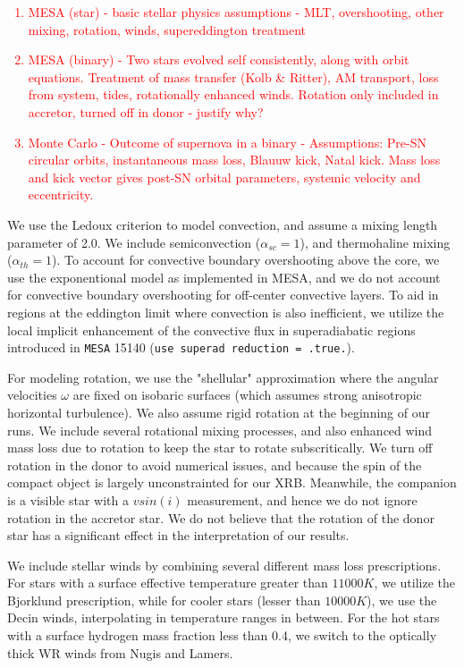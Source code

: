 \documentclass[linenumbers,trackchanges,twocolumn]{aastex701}
\newcommand{\red}{\textcolor{red}}
\begin{document}
\red{
\begin{enumerate}
    \item MESA (star) - basic stellar physics assumptions - MLT, overshooting, other mixing, rotation, winds, supereddington treatment
    \item MESA (binary) - Two stars evolved self consistently, along with orbit equations. Treatment of mass transfer (Kolb \& Ritter), AM transport, loss from system, tides, rotationally enhanced winds. Rotation only included in accretor, turned off in donor - justify why? 
    \item Monte Carlo - Outcome of supernova in a binary - Assumptions: Pre-SN circular orbits, instantaneous mass loss, Blauuw kick, Natal kick. Mass loss and kick vector gives post-SN orbital parameters, systemic velocity and eccentricity.
\end{enumerate}
}

We use the Ledoux criterion to model convection, and assume a mixing length parameter of 2.0. We include semiconvection ($\alpha_{sc}=1$), and thermohaline mixing ($\alpha_{th}=1$). To account for convective boundary overshooting above the core, we use the exponentional model as implemented in MESA, and we do not account for convective boundary overshooting for off-center convective layers. To aid in regions at the eddington limit where convection is also inefficient, we utilize the local implicit enhancement of the convective flux in superadiabatic regions introduced in \texttt{MESA} 15140 (\texttt{use superad reduction = .true.}).

For modeling rotation, we use the "shellular" approximation where the angular velocities $\omega$ are fixed on isobaric surfaces (which assumes strong anisotropic horizontal turbulence). We also assume rigid rotation at the beginning of our runs. We include several rotational mixing processes, and also enhanced wind mass loss due to rotation to keep the star to rotate subscritically. We turn off rotation in the donor to avoid numerical issues, and because the spin of the compact object is largely unconstrainted for our XRB. Meanwhile, the companion is a visible star with a $vsin(i)$ measurement, and hence we do not ignore rotation in the accretor star. We do not believe that the rotation of the donor star has a significant effect in the interpretation of our results. 

We include stellar winds by combining several different mass loss prescriptions. For stars with a surface effective temperature greater than $11000K$, we utilize the Bjorklund prescription, while for cooler stars (lesser than $10000K$), we use the Decin winds, interpolating in temperature ranges in between. For the hot stars with a surface hydrogen mass fraction less than 0.4, we switch to the optically thick WR winds from Nugis and Lamers.
\end{document}
